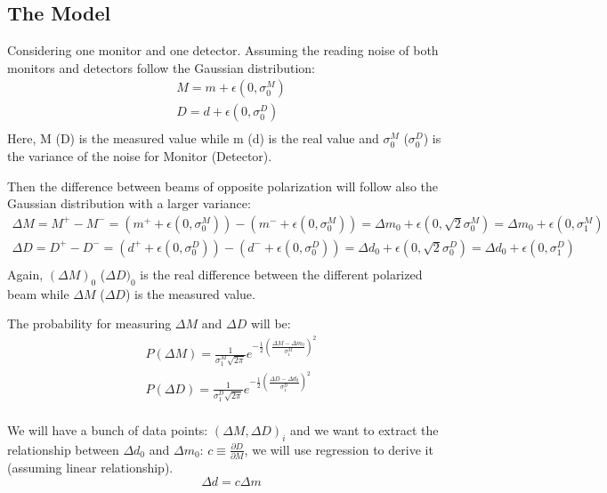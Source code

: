 \subsection{The Model}
Considering one monitor and one detector. Assuming the reading noise of both 
monitors and detectors follow the Gaussian distribution:
\begin{equation*}
    \begin{gathered}
	M = m + \epsilon(0, \sigma_0^M)    \\
	D = d + \epsilon(0, \sigma_0^D)    \\
    \end{gathered}
\end{equation*}
Here, M (D) is the measured value while m (d) is the real value and
$\sigma_0^M$ ($\sigma_0^D$) is the variance of the noise for Monitor (Detector).

Then the difference between beams of opposite polarization will follow also
the Gaussian distribution with a larger variance:
\begin{equation*}
    \begin{gathered}
	\Delta M = M^+ - M^- = (m^+ + \epsilon(0, \sigma_0^M)) - (m^- + \epsilon(0, \sigma_0^M))
	    = \Delta m_0 + \epsilon(0, \sqrt{2}\sigma_0^M)
	    = \Delta m_0 + \epsilon(0, \sigma_1^M) \\
	\Delta D = D^+ - D^- = (d^+ + \epsilon(0, \sigma_0^D)) - (d^- + \epsilon(0, \sigma_0^D))
	    = \Delta d_0 + \epsilon(0, \sqrt{2}\sigma_0^D)
	    = \Delta d_0 + \epsilon(0, \sigma_1^D) \\
    \end{gathered}
\end{equation*}
Again, $(\Delta M)_0$ ($\Delta D)_0$ is the real difference between the
different polarized beam while $\Delta M$ ($\Delta D$) is the measured value.

The probability for measuring $\Delta M$ and $\Delta D$ will be:
\begin{equation*}
    \begin{gathered}
	P(\Delta M) = \frac{1}{\sigma_1^M\sqrt{2\pi}} e^{-\frac{1}{2}\left( \frac{\Delta M - \Delta m_0}{\sigma_1^M}\right)^2}    \\
	P(\Delta D) = \frac{1}{\sigma_1^D\sqrt{2\pi}} e^{-\frac{1}{2}\left( \frac{\Delta D - \Delta d_0}{\sigma_1^D}\right)^2}    \\
    \end{gathered}
\end{equation*}

We will have a bunch of data points: $(\Delta M, \Delta D)_i$ and we want to
extract the relationship between $\Delta d_0$ and $\Delta m_0$: $c \equiv \frac{\partial D}{\partial M}$,
we will use regression to derive it (assuming linear relationship).
$$ \Delta d = c \Delta m $$

